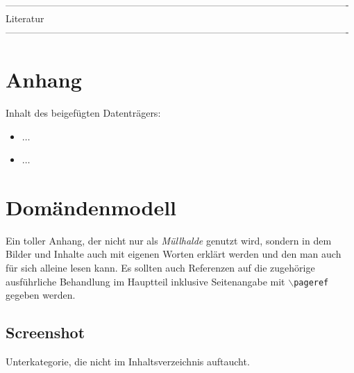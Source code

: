 \documentclass[12pt,a4paper,bibliography=totocnumbered,listof=totocnumbered]{article}
\begin{document}


 ----------------------------------------------------------------------------------------------------------
 Literatur
 ----------------------------------------------------------------------------------------------------------
\lhead{} 

\printbibliography[heading=Literatur,filter=Literatur] 

\pagebreak


\lhead{} 

\printbibliography[title = {Quellenverzeichnis}, heading=Quellen,filter=Quellen] 

\pagebreak 

\setcounter{page}{1}

\begin{appendix}
\section*{Anhang}
{}

Inhalt des beigefügten Datenträgers:
\begin{itemize}
  \item $\ldots$
  \item $\ldots$
\end{itemize}

\section{Domändenmodell}
Ein toller Anhang, der nicht nur als \glqq{}\emph{Müllhalde}\grqq{} genutzt wird, sondern in dem Bilder und Inhalte auch mit eigenen Worten erklärt werden und den man auch für sich alleine lesen kann. Es sollten auch Referenzen auf die zugehörige ausführliche Behandlung im Hauptteil inklusive Seitenangabe mit $\backslash$\texttt{pageref} gegeben werden.

\subsection*{Screenshot}
\label{app:screenshot}
Unterkategorie, die nicht im Inhaltsverzeichnis auftaucht.

\end{appendix}


\pagebreak
\end{document}
